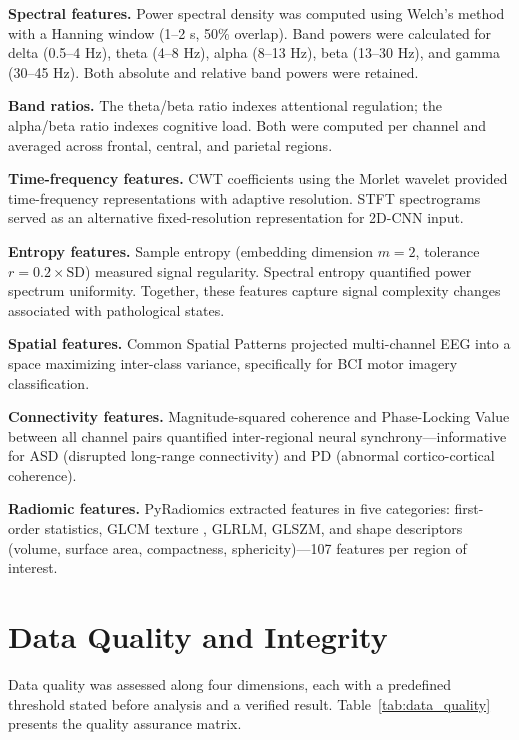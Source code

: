 \textbf{Spectral features.} Power spectral density was computed using Welch's method \citep{welch1967use} with a Hanning window (1--2 s, 50\% overlap). Band powers were calculated for delta (0.5--4 Hz), theta (4--8 Hz), alpha (8--13 Hz), beta (13--30 Hz), and gamma (30--45 Hz). Both absolute and relative band powers were retained.

\textbf{Band ratios.} The theta/beta ratio indexes attentional regulation; the alpha/beta ratio indexes cognitive load. Both were computed per channel and averaged across frontal, central, and parietal regions.

\textbf{Time-frequency features.} CWT coefficients using the Morlet wavelet \citep{mallat1989wavelet} provided time-frequency representations with adaptive resolution. STFT spectrograms \citep{welch1967use} served as an alternative fixed-resolution representation for 2D-CNN input.

\textbf{Entropy features.} Sample entropy \citep{richman2000sampleentropy} (embedding dimension $m = 2$, tolerance $r = 0.2 \times \text{SD}$) measured signal regularity. Spectral entropy quantified power spectrum uniformity. Together, these features capture signal complexity changes associated with pathological states.

\textbf{Spatial features.} Common Spatial Patterns \citep{ramoser2000csp} projected multi-channel EEG into a space maximizing inter-class variance, specifically for BCI motor imagery classification.

\textbf{Connectivity features.} Magnitude-squared coherence and Phase-Locking Value \citep{stam2007coherence} between all channel pairs quantified inter-regional neural synchrony---informative for ASD (disrupted long-range connectivity) and PD (abnormal cortico-cortical coherence).

\textbf{Radiomic features.} PyRadiomics \citep{vanGriethuysen2017pyradiomics} extracted features in five categories: first-order statistics, GLCM texture \citep{haralick1973glcm}, GLRLM, GLSZM, and shape descriptors (volume, surface area, compactness, sphericity)---107 features per region of interest.

\section{Data Quality and Integrity}
\label{sec:data_quality}

Data quality was assessed along four dimensions, each with a predefined threshold stated before analysis and a verified result. Table~\ref{tab:data_quality} presents the quality assurance matrix.

